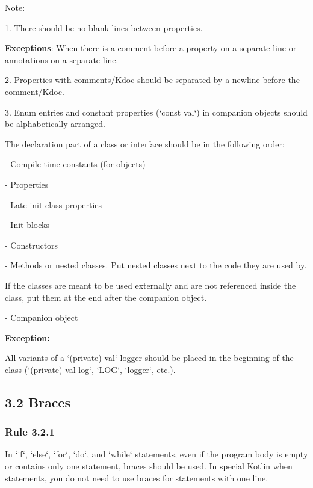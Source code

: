 Note:

1.	There should be no blank lines between properties.

\textbf{Exceptions}: When there is a comment before a property on a separate line or annotations on a separate line.

2.	Properties with comments/Kdoc should be separated by a newline before the comment/Kdoc.

3.	Enum entries and constant properties (`const val`) in companion objects should be alphabetically arranged.



The declaration part of a class or interface should be in the following order:

- Compile-time constants (for objects)

- Properties

- Late-init class properties

- Init-blocks

- Constructors

- Methods or nested classes. Put nested classes next to the code they are used by.

If the classes are meant to be used externally and are not referenced inside the class, put them at the end after the companion object.

- Companion object



\textbf{Exception:}

All variants of a `(private) val` logger should be placed in the beginning of the class (`(private) val log`, `LOG`, `logger`, etc.).



\subsection*{\textbf{3.2 Braces}}

\subsubsection*{\textbf{Rule 3.2.1}}
\leavevmode\newline



In `if`, `else`, `for`, `do`, and `while` statements, even if the program body is empty or contains only one statement, braces should be used. In special Kotlin when statements, you do not need to use braces for statements with one line.



